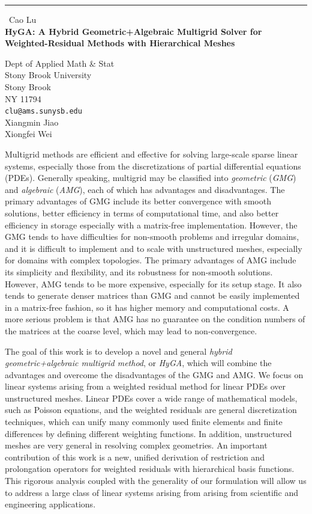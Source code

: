 \documentclass{report}
\begin{document}
\begin{center}
\rule{6in}{1pt} \
{\large Cao Lu \\
{\bf HyGA: A Hybrid Geometric+Algebraic Multigrid Solver for Weighted-Residual Methods with Hierarchical Meshes}}

Dept of Applied Math \& Stat  \\ Stony Brook University \\ Stony Brook \\ NY 11794
\\
{\tt clu@ams.sunysb.edu}\\
Xiangmin Jiao\\
Xiongfei Wei\end{center}

Multigrid methods are efficient and effective for solving large-scale
sparse linear systems, especially those from the discretizations of
partial differential equations (PDEs). Generally speaking, multigrid
may be classified into \emph{geometric} (\emph{GMG}) and \emph{algebraic}
(\emph{AMG}), each of which has advantages and disadvantages. The
primary advantages of GMG include its better convergence with smooth
solutions, better efficiency in terms of computational time, and also
better efficiency in storage especially with a matrix-free implementation.
However, the GMG tends to have difficulties for non-smooth problems
and irregular domains, and it is difficult to implement and to scale
with unstructured meshes, especially for domains with complex topologies.
The primary advantages of AMG include its simplicity and flexibility,
and its robustness for non-smooth solutions. However, AMG tends to
be more expensive, especially for its setup stage. It also tends to
generate denser matrices than GMG and cannot be easily implemented
in a matrix-free fashion, so it has higher memory and computational
costs. A more serious problem is that AMG has no guarantee on the
condition numbers of the matrices at the coarse level, which may lead
to non-convergence.

The goal of this work is to develop a novel and general \emph{hybrid
geometric+algebraic multigrid method}, or \emph{HyGA}, which will
combine the advantages and overcome the disadvantages of the GMG and
AMG. We focus on linear systems arising from a weighted residual
method for linear PDEs over unstructured meshes. Linear PDEs cover
a wide range of mathematical models, such as Poisson equations, and
the weighted residuals are general discretization techniques, which
can unify many commonly used finite elements and finite differences
by defining different weighting functions. In addition, unstructured
meshes are very general in resolving complex geometries. An important
contribution of this work is a new, unified derivation of restriction
and prolongation operators for weighted residuals with hierarchical
basis functions. This rigorous analysis coupled with the generality
of our formulation will allow us to address a large class of linear
systems arising from arising from scientific and engineering applications.
\end{document}
